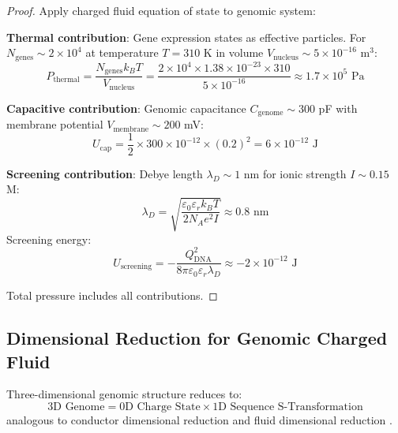 \begin{proof}
Apply charged fluid equation of state to genomic system:

\textbf{Thermal contribution}: Gene expression states as effective particles. For $N_{\text{genes}} \sim 2 \times 10^4$ at temperature $T = 310$ K in volume $V_{\text{nucleus}} \sim 5 \times 10^{-16}$ m$^3$:
\begin{equation}
P_{\text{thermal}} = \frac{N_{\text{genes}}k_BT}{V_{\text{nucleus}}} = \frac{2 \times 10^4 \times 1.38 \times 10^{-23} \times 310}{5 \times 10^{-16}} \approx 1.7 \times 10^5 \text{ Pa}
\end{equation}

\textbf{Capacitive contribution}: Genomic capacitance $C_{\text{genome}} \sim 300$ pF with membrane potential $V_{\text{membrane}} \sim 200$ mV:
\begin{equation}
U_{\text{cap}} = \frac{1}{2} \times 300 \times 10^{-12} \times (0.2)^2 = 6 \times 10^{-12} \text{ J}
\end{equation}

\textbf{Screening contribution}: Debye length $\lambda_D \sim 1$ nm for ionic strength $I \sim 0.15$ M:
\begin{equation}
\lambda_D = \sqrt{\frac{\varepsilon_0\varepsilon_r k_BT}{2N_A e^2 I}} \approx 0.8 \text{ nm}
\end{equation}
Screening energy:
\begin{equation}
U_{\text{screening}} = -\frac{Q_{\text{DNA}}^2}{8\pi\varepsilon_0\varepsilon_r\lambda_D} \approx -2 \times 10^{-12} \text{ J}
\end{equation}

Total pressure includes all contributions.
\end{proof}

\subsection{Dimensional Reduction for Genomic Charged Fluid}

\begin{theorem}
\label{thm:genomic_dimensional_reduction}
Three-dimensional genomic structure reduces to:
\begin{equation}
\text{3D Genome} = \text{0D Charge State} \times \text{1D Sequence S-Transformation}
\end{equation}
analogous to conductor dimensional reduction \citep{Sachikonye2025_Current} and fluid dimensional reduction \citep{Sachikonye2025_Fluid}.
\end{theorem}

